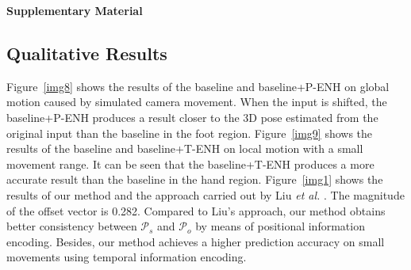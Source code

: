 \documentclass[sigconf]{acmart}
\begin{document}
\onecolumn
\begin{center}
\begin{Huge} 
\textbf{Supplementary Material}
\vspace{0.6cm}
\end{Huge}
\end{center}
\begin{multicols}{2}

















\setcounter{equation}{0}
\setcounter{figure}{0}
\setcounter{table}{0}
\setcounter{page}{1}
\setcounter{section}{0}
\makeatletter

\section{Qualitative Results}
Figure~\ref{img8} shows the results of the baseline and baseline+P-ENH on global motion caused by simulated camera movement. When the input is shifted, the baseline+P-ENH produces a result closer to the 3D pose estimated from the original input than the baseline in the foot region. Figure~\ref{img9} shows the results of the baseline and baseline+T-ENH on local motion with a small movement range. It can be seen that the baseline+T-ENH produces a more accurate result than the baseline in the hand region. Figure~\ref{img1} shows the results of our method and the approach carried out by Liu \textit{et al.} . The magnitude of the offset vector is 0.282. Compared to Liu's approach, our method obtains better consistency between $\mathcal{P}_{s}$ and $\mathcal{P}_{o}$ by means of positional information encoding. Besides, our method achieves a higher prediction accuracy on small movements using temporal information encoding.


\end{multicols}
\end{document}
